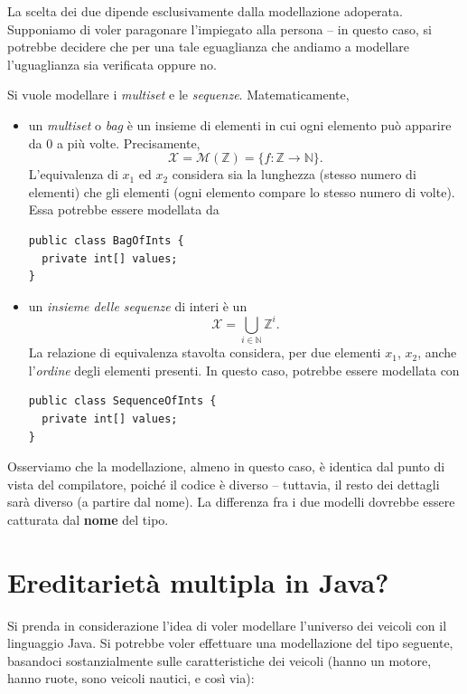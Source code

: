 \documentclass[\fontsizeclass,twocolumn]{\classname}
\theoremstyle{definition}
\theoremstyle{definition}
\begin{document}
La scelta dei due dipende esclusivamente dalla modellazione adoperata.
Supponiamo di voler paragonare l'impiegato alla persona \--- in questo caso, si
potrebbe decidere che per una tale eguaglianza che andiamo a modellare
l'uguaglianza sia verificata oppure no.

Si vuole modellare i \emph{multiset} e le \emph{sequenze}. Matematicamente,

\begin{itemize}
    \item un \emph{multiset} o \emph{bag} è un insieme di elementi in cui ogni elemento può
        apparire da $0$ a più volte. Precisamente, $$\mathcal X = \mathcal M
        (\mathbb{Z}) = \{f:\mathbb{Z} \rightarrow \mathbb{N}\}.$$ L'equivalenza
        di $x_1$ ed $x_2$ considera sia la lunghezza (stesso numero di
        elementi) che gli elementi (ogni elemento compare lo stesso numero di
        volte). Essa potrebbe essere modellata da 
        

\begin{lstlisting}
public class BagOfInts {
  private int[] values;
}
\end{lstlisting}
    \item un \emph{insieme delle sequenze} di interi è un $$\mathcal X = \bigcup
        _{i\in\mathbb{N}}\mathbb{Z}^i.$$ La relazione di equivalenza stavolta
        considera, per due elementi $x_1$, $x_2$, anche l'\emph{ordine} degli
        elementi presenti. In questo caso, potrebbe essere modellata con

\begin{lstlisting}
public class SequenceOfInts {
  private int[] values;
}
\end{lstlisting}
\end{itemize}

Osserviamo che la modellazione, almeno in questo caso, è identica dal punto di
vista del compilatore, poiché il codice è diverso \--- tuttavia, il resto dei
dettagli sarà diverso (a partire dal nome). La differenza fra i due modelli
dovrebbe essere catturata dal \textbf{nome} del tipo.

\section{Ereditarietà multipla in Java?}

Si prenda in considerazione l'idea di voler modellare l'universo dei veicoli
con il linguaggio Java. Si potrebbe voler effettuare una modellazione del tipo
seguente, basandoci sostanzialmente sulle caratteristiche dei veicoli (hanno un
motore, hanno ruote, sono veicoli nautici, e così via):
\end{document}
